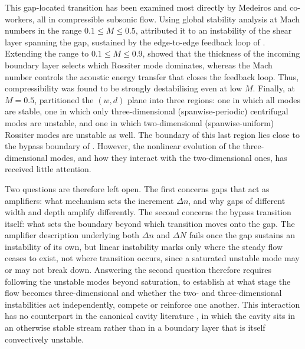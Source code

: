 \documentclass[lineno]{jfm}
\begin{document}
This gap-located transition has been examined most directly by Medeiros and co-workers, all in compressible subsonic flow. Using global stability analysis at Mach numbers in the range $0.1\leq M\leq0.5$, \citet{mathiasMedeiros2019} attributed it to an instability of the shear layer spanning the gap, sustained by the edge-to-edge feedback loop of \citet{rossiter1964}. Extending the range to $0.1\leq M\leq0.9$, \citet{mathiasMedeiros2021} showed that the thickness of the incoming boundary layer selects which Rossiter mode dominates, whereas the Mach number controls the acoustic energy transfer that closes the feedback loop. Thus, compressibility was found to be strongly destabilising even at low $M$. Finally, at $M=0.5$, \citet{aguirreMedeiros2024} partitioned the $(w,d)$ plane into three regions: one in which all modes are stable, one in which only three-dimensional (spanwise-periodic) centrifugal modes are unstable, and one in which two-dimensional (spanwise-uniform) Rossiter modes are unstable as well. The boundary of this last region lies close to the bypass boundary of \citet{jeffGaps}. However, the nonlinear evolution of the three-dimensional modes, and how they interact with the two-dimensional ones, has received little attention.

Two questions are therefore left open. The first concerns gaps that act as amplifiers: what mechanism sets the increment $\Delta n$, and why gaps of different width and depth amplify differently. The second concerns the bypass transition itself: what sets the boundary beyond which transition moves onto the gap. The amplifier description underlying both $\Delta n$ and $\Delta N$ fails once the gap sustains an instability of its own, but linear instability marks only where the steady flow ceases to exist, not where transition occurs, since a saturated unstable mode may or may not break down. Answering the second question therefore requires following the unstable modes beyond saturation, to establish at what stage the flow becomes three-dimensional and whether the two- and three-dimensional instabilities act independently, compete or reinforce one another. This interaction has no counterpart in the canonical cavity literature \citep{GharibRoshko1987,dynandcontrol,bresColonius2008,Citro2015}, in which the cavity sits in an otherwise stable stream rather than in a boundary layer that is itself convectively unstable.
\end{document}
